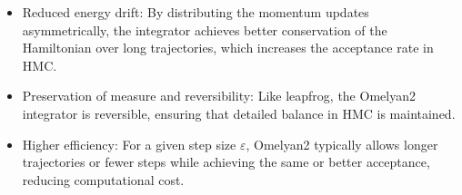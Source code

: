 \begin{itemize}
    \item Reduced energy drift: By distributing the momentum updates asymmetrically, the integrator achieves better conservation of the Hamiltonian over long trajectories, which increases the acceptance rate in HMC.  
    \item Preservation of measure and reversibility: Like leapfrog, the Omelyan2 integrator is reversible, ensuring that detailed balance in HMC is maintained.  
    \item Higher efficiency: For a given step size $\varepsilon$, Omelyan2 typically allows longer trajectories or fewer steps while achieving the same or better acceptance, reducing computational cost.  
\end{itemize}
